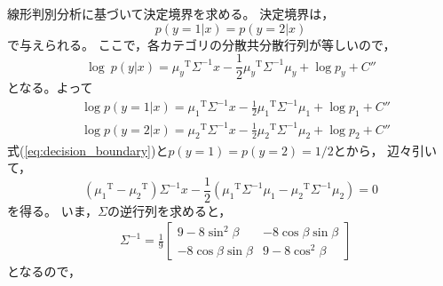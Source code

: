 \documentclass[class=jsarticle, crop=false, dvipdfmx, fleqn]{standalone}
\begin{document}
線形判別分析に基づいて決定境界を求める。
決定境界は，
\begin{equation}
	p(y=1|x) = p(y=2|x)
	\label{eq:decision_boundary}
\end{equation}
で与えられる。
ここで，各カテゴリの分散共分散行列が等しいので，
\begin{equation}
	\log\ p(y|x) = {\mu_y}^\mathrm{T} \Sigma^{-1} x - \frac{1}{2} {\mu_y}^\mathrm{T} \Sigma^{-1} \mu_y + \log{p_y} + C''
	\label{eq:log_probability}
\end{equation}
となる。よって
\begin{align}
	& \log p(y=1|x) = {\mu_1}^\mathrm{T} \Sigma^{-1} x - \frac{1}{2} {\mu_1}^\mathrm{T} \Sigma^{-1} \mu_1 + \log{p_1} + C'' \\
	& \log p(y=2|x) = {\mu_2}^\mathrm{T} \Sigma^{-1} x - \frac{1}{2} {\mu_2}^\mathrm{T} \Sigma^{-1} \mu_2 + \log{p_2} + C''
\end{align}
式(\ref{eq:decision_boundary})と\(p(y=1) = p(y=2) = 1/2 \)とから，
辺々引いて，
\begin{equation}
	({\mu_1}^\mathrm{T} - {\mu_2}^\mathrm{T}) \Sigma^{-1} x - \frac{1}{2} ({\mu_1}^\mathrm{T} \Sigma^{-1} \mu_1 - {\mu_2}^\mathrm{T} \Sigma^{-1} \mu_2) = 0
	\label{eq:answer_character_expression}
\end{equation}
を得る。
いま，\(\Sigma\)の逆行列を求めると，
\begin{align}
	& \Sigma^{-1} = \frac{1}{9}
		\begin{bmatrix}
			9-8{\sin}^2 \beta & -8 \cos\beta \sin\beta \\
			-8 \cos\beta \sin\beta & 9-8{\cos}^2 \beta
		\end{bmatrix}
\end{align}
となるので，
\end{document}
